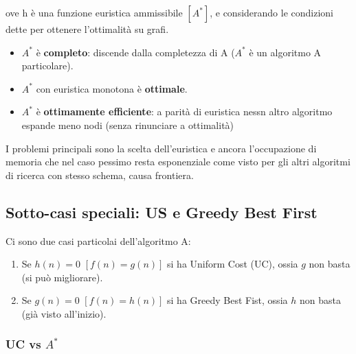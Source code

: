 ove h è una funzione euristica ammissibile $[A^*]$, e considerando le condizioni dette per ottenere l’ottimalità su grafi.
\begin{itemize}
    \item $A^*$ è \textbf{completo}: discende dalla completezza di A ($A^*$ è un algoritmo A particolare).
    \item $A^*$ con euristica monotona è \textbf{ottimale}.
    \item $A^*$ è \textbf{ottimamente efficiente}: a parità di euristica nessn altro algoritmo espande meno nodi (senza rinunciare a ottimalità)
\end{itemize}
I problemi principali sono la scelta dell'euristica e  ancora l'occupazione di memoria che nel caso
pessimo resta esponenziale come visto per gli altri algoritmi di ricerca con stesso schema, causa frontiera.

\subsection{Sotto-casi speciali: US e Greedy Best First}
Ci sono due casi particolai dell'algoritmo A:
\begin{enumerate}
    \item Se $h(n) = 0$ $[f(n) = g(n)]$ si ha Uniform Cost (UC), ossia $g$ non basta (si può migliorare).
    \item Se $g(n) = 0$ $[f(n) = h(n)]$ si ha Greedy Best Fist, ossia $h$ non basta (già visto all'inizio).
\end{enumerate}
\subsubsection{UC vs $A^*$}

